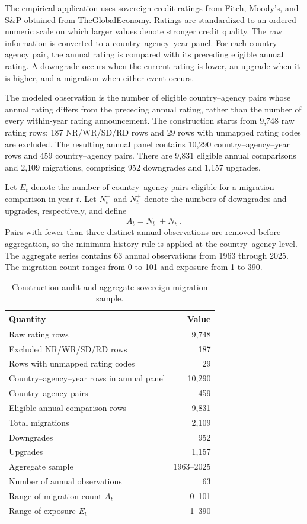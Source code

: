\documentclass[11pt]{article}
\theoremstyle{definition}
\begin{document}
The empirical application uses sovereign credit ratings from Fitch, Moody's, and
S\&P obtained from TheGlobalEconomy. Ratings are standardized to an ordered numeric
scale on which larger values denote stronger credit quality. The raw information is
converted to a country--agency--year panel. For each country--agency pair, the annual
rating is compared with its preceding eligible annual rating. A downgrade occurs
when the current rating is lower, an upgrade when it is higher, and a migration when
either event occurs.

The modeled observation is the number of eligible country--agency pairs whose annual
rating differs from the preceding annual rating, rather than the number of every
within-year rating announcement. The construction starts from 9,748 raw rating rows;
187 NR/WR/SD/RD rows and 29 rows with unmapped rating codes are excluded. The
resulting annual panel contains 10,290 country--agency--year rows and 459
country--agency pairs. There are 9,831 eligible annual comparisons and 2,109
migrations, comprising 952 downgrades and 1,157 upgrades.

Let $E_t$ denote the number of country--agency pairs eligible for a migration
comparison in year $t$. Let $N_t^{-}$ and $N_t^{+}$ denote the numbers of downgrades
and upgrades, respectively, and define
\begin{equation}
A_t=N_t^{-}+N_t^{+}.
\label{eq:At}
\end{equation}
Pairs with fewer than three distinct annual observations are removed before
aggregation, so the minimum-history rule is applied at the country--agency level.
The aggregate series contains 63 annual observations from 1963 through 2025. The
migration count ranges from 0 to 101 and exposure from 1 to 390.

\begin{table}[t]
\centering
\caption{Construction audit and aggregate sovereign migration sample.}
\label{tab:data-summary}
\begin{tabular}{lr}
\toprule
Quantity & Value \\
\midrule
Raw rating rows & 9,748 \\
Excluded NR/WR/SD/RD rows & 187 \\
Rows with unmapped rating codes & 29 \\
Country--agency--year rows in annual panel & 10,290 \\
Country--agency pairs & 459 \\
Eligible annual comparison rows & 9,831 \\
Total migrations & 2,109 \\
Downgrades & 952 \\
Upgrades & 1,157 \\
Aggregate sample & 1963--2025 \\
Number of annual observations & 63 \\
Range of migration count $A_t$ & 0--101 \\
Range of exposure $E_t$ & 1--390 \\
\bottomrule
\end{tabular}
\end{table}
\end{document}
